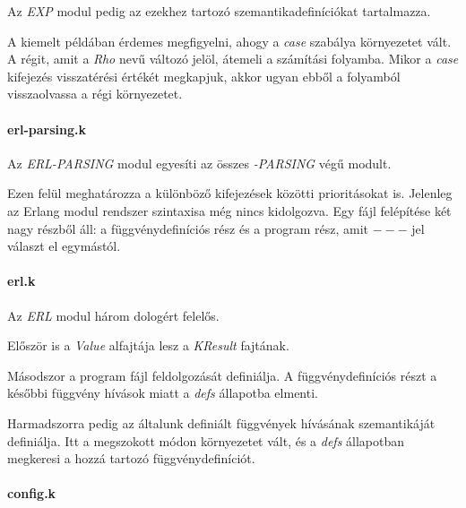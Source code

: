 

Az \textit{EXP} modul pedig az ezekhez tartozó szemantikadefiníciókat tartalmazza.



A kiemelt példában érdemes megfigyelni, ahogy a \textit{case} szabálya környezetet vált. A régit, amit a \textit{Rho} nevű változó jelöl, átemeli a számítási folyamba. Mikor a \textit{case} kifejezés visszatérési értékét megkapjuk, akkor ugyan ebből a folyamból visszaolvassa a régi környezetet.

\paragraph{erl-parsing.k}

Az \textit{ERL-PARSING} modul egyesíti az összes \textit{-PARSING} végű modult.



Ezen felül meghatározza a különböző kifejezések közötti prioritásokat is. Jelenleg az Erlang modul rendszer szintaxisa még nincs kidolgozva. Egy fájl felépítése két nagy részből áll: a függvénydefiníciós rész és a program rész, amit $---$ jel választ el egymástól.

\paragraph{erl.k}

Az \textit{ERL} modul három dologért felelős.



Először is a \textit{Value} alfajtája lesz a \textit{KResult} fajtának.



Másodszor a program fájl feldolgozását definiálja. A függvénydefiníciós részt a későbbi függvény hívások miatt a \textit{defs} állapotba elmenti.



Harmadszorra pedig az általunk definiált függvények hívásának szemantikáját definiálja. Itt a megszokott módon környezetet vált, és a \textit{defs} állapotban megkeresi a hozzá tartozó függvénydefiníciót.

\paragraph{config.k}

